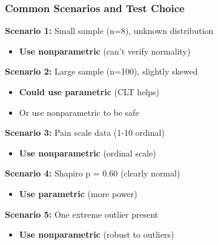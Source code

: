 \documentclass{beamer}
\begin{document}
\begin{frame}
\frametitle{Common Scenarios and Test Choice}

\textbf{Scenario 1:} Small sample (n=8), unknown distribution
\begin{itemize}
\item \textbf{Use nonparametric} (can't verify normality)
\end{itemize}

\vspace{0.3cm}
\textbf{Scenario 2:} Large sample (n=100), slightly skewed
\begin{itemize}
\item \textbf{Could use parametric} (CLT helps)
\item Or use nonparametric to be safe
\end{itemize}

\vspace{0.3cm}
\textbf{Scenario 3:} Pain scale data (1-10 ordinal)
\begin{itemize}
\item \textbf{Use nonparametric} (ordinal scale)
\end{itemize}

\vspace{0.3cm}
\textbf{Scenario 4:} Shapiro p = 0.60 (clearly normal)
\begin{itemize}
\item \textbf{Use parametric} (more power)
\end{itemize}

\vspace{0.3cm}
\textbf{Scenario 5:} One extreme outlier present
\begin{itemize}
\item \textbf{Use nonparametric} (robust to outliers)
\end{itemize}
\end{frame}
\end{document}
